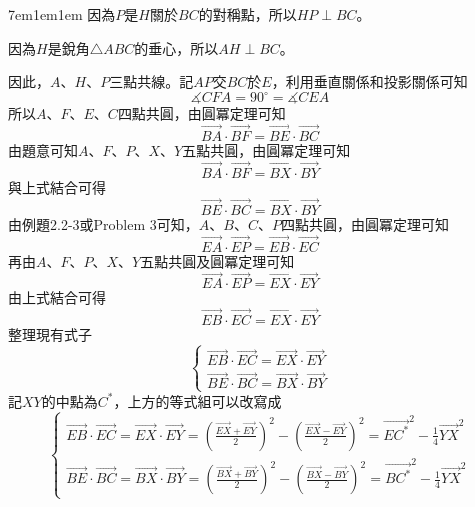 \documentclass[12pt]{article}
\begin{document}
\begin{mybox}[Answer 4*]{7em}{1em}{1em}
    因為$P$是$H$關於$BC$的對稱點，所以$HP\perp BC$。

    因為$H$是銳角$\triangle{ABC}$的垂心，所以$AH\perp BC$。

    因此，$A$、$H$、$P$三點共線。記$AP$交$BC$於$E$，利用垂直關係和投影關係可知
    $$
        \measuredangle{CFA}=90^{\circ}=\measuredangle{CEA}
    $$
    所以$A$、$F$、$E$、$C$四點共圓，由圓冪定理可知
    $$
        \overrightarrow{BA}\cdot\overrightarrow{BF}=\overrightarrow{BE}\cdot\overrightarrow{BC}
    $$
    由題意可知$A$、$F$、$P$、$X$、$Y$五點共圓，由圓冪定理可知
    $$
        \overrightarrow{BA}\cdot\overrightarrow{BF}=\overrightarrow{BX}\cdot\overrightarrow{BY}
    $$
    與上式結合可得
    $$
        \overrightarrow{BE}\cdot\overrightarrow{BC}=\overrightarrow{BX}\cdot\overrightarrow{BY}
    $$
    由例題2.2-3或Problem 3可知，$A$、$B$、$C$、$P$四點共圓，由圓冪定理可知
    $$
        \overrightarrow{EA}\cdot\overrightarrow{EP}=\overrightarrow{EB}\cdot\overrightarrow{EC}
    $$
    再由$A$、$F$、$P$、$X$、$Y$五點共圓及圓冪定理可知
    $$
        \overrightarrow{EA}\cdot\overrightarrow{EP}=\overrightarrow{EX}\cdot\overrightarrow{EY}
    $$
    由上式結合可得
    $$
        \overrightarrow{EB}\cdot\overrightarrow{EC}=\overrightarrow{EX}\cdot\overrightarrow{EY}
    $$
    整理現有式子
    $$
        \begin{cases}
            \overrightarrow{EB}\cdot\overrightarrow{EC}=\overrightarrow{EX}\cdot\overrightarrow{EY}\\
            \overrightarrow{BE}\cdot\overrightarrow{BC}=\overrightarrow{BX}\cdot\overrightarrow{BY}
        \end{cases}
    $$
    記$XY$的中點為$C^\ast$，上方的等式組可以改寫成
    $$
        \begin{cases}
            \overrightarrow{EB}\cdot\overrightarrow{EC}=\overrightarrow{EX}\cdot\overrightarrow{EY}
            =\left(\frac{\overrightarrow{EX}+\overrightarrow{EY}}{2}\right)^2-\left(\frac{\overrightarrow{EX}-\overrightarrow{EY}}{2}\right)^2
            =\overrightarrow{EC^\ast}^2-\frac{1}{4}\overrightarrow{YX}^2\\
            \overrightarrow{BE}\cdot\overrightarrow{BC}=\overrightarrow{BX}\cdot\overrightarrow{BY}
            =\left(\frac{\overrightarrow{BX}+\overrightarrow{BY}}{2}\right)^2-\left(\frac{\overrightarrow{BX}-\overrightarrow{BY}}{2}\right)^2
            =\overrightarrow{BC^\ast}^2-\frac{1}{4}\overrightarrow{YX}^2
        \end{cases}
$$
\end{mybox}
\end{document}
